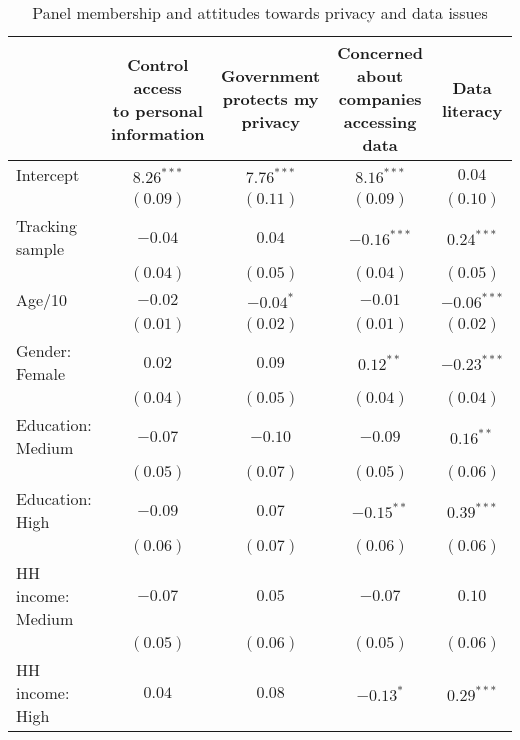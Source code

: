 
\begin{table}[h]
\caption{Panel membership and attitudes towards privacy and data issues}
\begin{center}
\begin{tabular}{l c c c c}
\toprule
 & \shortstack{Control access \\ to personal \\ information} & \shortstack{Government \\ protects my \\ privacy} & \shortstack{Concerned about \\ companies \\ accessing data} & \shortstack{~\\ Data literacy\\~} \\
\midrule
Intercept         & $8.26^{***}$ & $7.76^{***}$ & $8.16^{***}$  & $0.04$        \\
                  & $(0.09)$     & $(0.11)$     & $(0.09)$      & $(0.10)$      \\
Tracking sample   & $-0.04$      & $0.04$       & $-0.16^{***}$ & $0.24^{***}$  \\
                  & $(0.04)$     & $(0.05)$     & $(0.04)$      & $(0.05)$      \\
Age/10            & $-0.02$      & $-0.04^{*}$  & $-0.01$       & $-0.06^{***}$ \\
                  & $(0.01)$     & $(0.02)$     & $(0.01)$      & $(0.02)$      \\
Gender: Female    & $0.02$       & $0.09$       & $0.12^{**}$   & $-0.23^{***}$ \\
                  & $(0.04)$     & $(0.05)$     & $(0.04)$      & $(0.04)$      \\
Education: Medium & $-0.07$      & $-0.10$      & $-0.09$       & $0.16^{**}$   \\
                  & $(0.05)$     & $(0.07)$     & $(0.05)$      & $(0.06)$      \\
Education: High   & $-0.09$      & $0.07$       & $-0.15^{**}$  & $0.39^{***}$  \\
                  & $(0.06)$     & $(0.07)$     & $(0.06)$      & $(0.06)$      \\
HH income: Medium & $-0.07$      & $0.05$       & $-0.07$       & $0.10$        \\
                  & $(0.05)$     & $(0.06)$     & $(0.05)$      & $(0.06)$      \\
HH income: High   & $0.04$       & $0.08$       & $-0.13^{*}$   & $0.29^{***}$  \\

\end{tabular}
\end{center}
\end{table}
